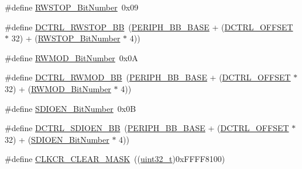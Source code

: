 \begin{DoxyCompactItemize}
\#define \hyperlink{group___s_d_i_o___private___types_definitions_gae8c0654ad5cba23281bcfa77ef19b9cf}{R\+W\+S\+T\+O\+P\+\_\+\+Bit\+Number}~0x09
\item 
\#define \hyperlink{group___s_d_i_o___private___types_definitions_ga678da1db835676b0fb1976cf3408e2d1}{D\+C\+T\+R\+L\+\_\+\+R\+W\+S\+T\+O\+P\+\_\+\+BB}~(\hyperlink{openmotestm_2library_2inc_2stm32f10x__map_8h_aed7efc100877000845c236ccdc9e144a}{P\+E\+R\+I\+P\+H\+\_\+\+B\+B\+\_\+\+B\+A\+SE} + (\hyperlink{openmotestm_2library_2src_2stm32f10x__sdio_8c_a948c1382c4cfd3af3e406c4d0cdd4240}{D\+C\+T\+R\+L\+\_\+\+O\+F\+F\+S\+ET} $\ast$ 32) + (\hyperlink{openmotestm_2library_2src_2stm32f10x__sdio_8c_ae8c0654ad5cba23281bcfa77ef19b9cf}{R\+W\+S\+T\+O\+P\+\_\+\+Bit\+Number} $\ast$ 4))
\item 
\#define \hyperlink{group___s_d_i_o___private___types_definitions_gad7b722671f65e79d1be2899b643278ad}{R\+W\+M\+O\+D\+\_\+\+Bit\+Number}~0x0A
\item 
\#define \hyperlink{group___s_d_i_o___private___types_definitions_gad34bfe8650534ce24320ae83886c91e3}{D\+C\+T\+R\+L\+\_\+\+R\+W\+M\+O\+D\+\_\+\+BB}~(\hyperlink{openmotestm_2library_2inc_2stm32f10x__map_8h_aed7efc100877000845c236ccdc9e144a}{P\+E\+R\+I\+P\+H\+\_\+\+B\+B\+\_\+\+B\+A\+SE} + (\hyperlink{openmotestm_2library_2src_2stm32f10x__sdio_8c_a948c1382c4cfd3af3e406c4d0cdd4240}{D\+C\+T\+R\+L\+\_\+\+O\+F\+F\+S\+ET} $\ast$ 32) + (\hyperlink{openmotestm_2library_2src_2stm32f10x__sdio_8c_ad7b722671f65e79d1be2899b643278ad}{R\+W\+M\+O\+D\+\_\+\+Bit\+Number} $\ast$ 4))
\item 
\#define \hyperlink{group___s_d_i_o___private___types_definitions_ga37f3e1612e0dae8160be978ebfa54301}{S\+D\+I\+O\+E\+N\+\_\+\+Bit\+Number}~0x0B
\item 
\#define \hyperlink{group___s_d_i_o___private___types_definitions_ga894f7da62b89ddd9f4b79d066056a3c7}{D\+C\+T\+R\+L\+\_\+\+S\+D\+I\+O\+E\+N\+\_\+\+BB}~(\hyperlink{openmotestm_2library_2inc_2stm32f10x__map_8h_aed7efc100877000845c236ccdc9e144a}{P\+E\+R\+I\+P\+H\+\_\+\+B\+B\+\_\+\+B\+A\+SE} + (\hyperlink{openmotestm_2library_2src_2stm32f10x__sdio_8c_a948c1382c4cfd3af3e406c4d0cdd4240}{D\+C\+T\+R\+L\+\_\+\+O\+F\+F\+S\+ET} $\ast$ 32) + (\hyperlink{openmotestm_2library_2src_2stm32f10x__sdio_8c_a37f3e1612e0dae8160be978ebfa54301}{S\+D\+I\+O\+E\+N\+\_\+\+Bit\+Number} $\ast$ 4))
\item 
\#define \hyperlink{group___s_d_i_o___private___types_definitions_gac8d10dd1e49ca9e8a6954146654e9a01}{C\+L\+K\+C\+R\+\_\+\+C\+L\+E\+A\+R\+\_\+\+M\+A\+SK}~((\hyperlink{_p_e___types_8h_a33594304e786b158f3fb30289278f5af}{uint32\+\_\+t})0x\+F\+F\+F\+F8100)

\end{DoxyCompactItemize}
